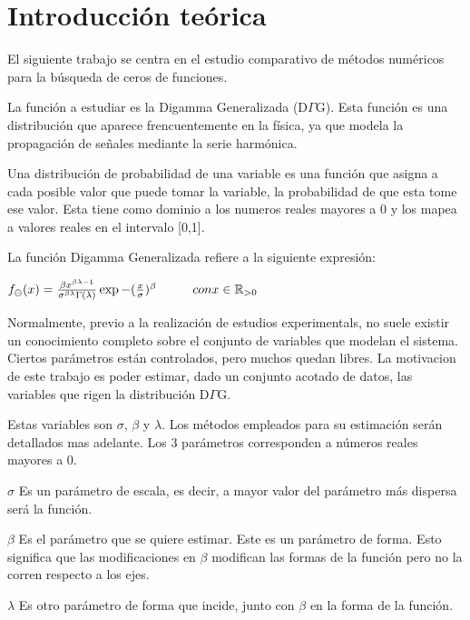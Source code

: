 \section{Introducci\'on te\'orica}

El siguiente trabajo se centra en el estudio comparativo de m\'etodos
num\'ericos para la b\'usqueda de ceros de funciones. 

La funci\'on a estudiar es la Digamma Generalizada (D$\Gamma$G). 
Esta funci\'on es una distribuci\'on que aparece frencuentemente en la f\'isica,
ya que modela la propagaci\'on de se\~nales mediante la serie harm\'onica.

Una distribuci\'on de probabilidad de una variable es una funci\'on que asigna
a cada posible valor que puede tomar la variable, la probabilidad de que esta
tome ese valor. Esta tiene como dominio a los numeros reales mayores a
0 y los mapea a valores reales en el intervalo [0,1].

La funci\'on Digamma Generalizada refiere a la siguiente expresi\'on:

\begin{center}
\begin{math}
f_{\ominus}(x) = \frac{\beta x^{\beta \lambda -1}}{\sigma ^{\beta \lambda}
\Gamma(\lambda)}\exp {-(\frac{x}{\sigma})^{\beta}} \hspace{10 mm} con x \in \mathbb{R}_{>0}
\end{math}
\end{center}

Normalmente, previo a la realizaci\'on de estudios experimentals, no suele
existir un conocimiento completo sobre el conjunto de variables que modelan
el sistema. Ciertos par\'ametros est\'an controlados, pero muchos quedan libres. 
La motivacion de este trabajo es poder estimar, dado un conjunto acotado de datos, 
las variables que rigen la distribuci\'on D$\Gamma$G. 

Estas variables son $\sigma$, $\beta$ y $\lambda$. Los m\'etodos empleados para 
su estimaci\'on ser\'an detallados mas adelante. Los 3 par\'ametros corresponden
a n\'umeros reales mayores a 0.

\begin{itemize}
  \begin{item} $\sigma$ Es un par\'ametro de escala, es decir, a mayor valor del
par\'ametro m\'as dispersa ser\'a la funci\'on.\end{item}
  \begin{item} $\beta$ Es el par\'ametro que se quiere estimar. Este es un
par\'ametro de forma. Esto significa que las modificaciones en $\beta$ modifican
las formas de la funci\'on pero no la corren respecto a los ejes. \end{item}
  \begin{item} $\lambda$ Es otro par\'ametro de forma que incide, junto con
$\beta$ en la forma de la funci\'on.\end{item}
\end{itemize}


